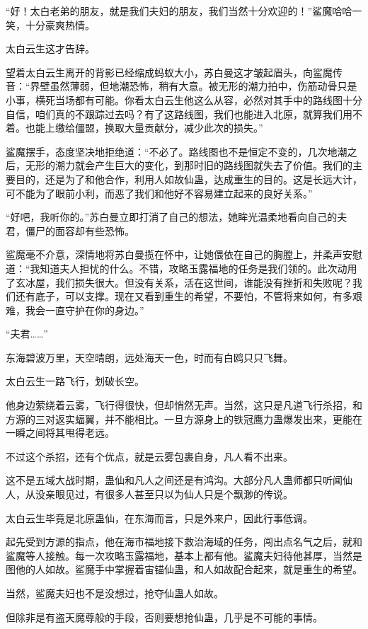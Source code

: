 \begin{this_body}
“好！太白老弟的朋友，就是我们夫妇的朋友，我们当然十分欢迎的！”鲨魔哈哈一笑，十分豪爽热情。

太白云生这才告辞。

望着太白云生离开的背影已经缩成蚂蚁大小，苏白曼这才皱起眉头，向鲨魔传音：“界壁虽然薄弱，但地潮恐怖，稍有大意。被无形的潮力拍中，伤筋动骨只是小事，横死当场都有可能。你看太白云生他这么从容，必然对其手中的路线图十分自信，咱们真的不跟踪过去吗？有了这路线图，我们也能进入北原，就算我们用不着。也能上缴给僵盟，换取大量贡献分，减少此次的损失。”

鲨魔摆手，态度坚决地拒绝道：“不必了。路线图也不是恒定不变的，几次地潮之后，无形的潮力就会产生巨大的变化，到那时旧的路线图就失去了价值。我们的主要目的，还是为了和他合作，利用人如故仙蛊，达成重生的目的。这是长远大计，可不能为了眼前小利，而恶了我们和他好不容易建立起来的良好关系。”

“好吧，我听你的。”苏白曼立即打消了自己的想法，她眸光温柔地看向自己的夫君，僵尸的面容却有些恐怖。

鲨魔毫不介意，深情地将苏白曼揽在怀中，让她偎依在自己的胸膛上，并柔声安慰道：“我知道夫人担忧的什么。不错，攻略玉露福地的任务是我们领的。此次动用了玄冰屋，我们损失很大。但没有关系，活在这世间，谁能没有挫折和失败呢？我们还有底子，可以支撑。现在又看到重生的希望，不要怕，不管将来如何，有多艰难，我会一直守护在你的身边。”

“夫君……”

东海碧波万里，天空晴朗，远处海天一色，时而有白鸥只只飞舞。

太白云生一路飞行，划破长空。

他身边萦绕着云雾，飞行得很快，但却悄然无声。当然，这只是凡道飞行杀招，和方源的三对返实蝠翼，并不能相比。一旦方源身上的铁冠鹰力蛊爆发出来，更能在一瞬之间将其甩得老远。

不过这个杀招，还有个优点，就是云雾包裹自身，凡人看不出来。

这不是五域大战时期，蛊仙和凡人之间还是有鸿沟。大部分凡人蛊师都只听闻仙人，从没亲眼见过，有很多人甚至只以为仙人只是个飘渺的传说。

太白云生毕竟是北原蛊仙，在东海而言，只是外来户，因此行事低调。

起先受到方源的指点，他在海市福地接下救治海域的任务，闯出点名气之后，就和鲨魔等人接触。每一次攻略玉露福地，基本上都有他。鲨魔夫妇待他甚厚，当然是图他的人如故。鲨魔手中掌握着宙锚仙蛊，和人如故配合起来，就是重生的希望。

当然，鲨魔夫妇也不是没想过，抢夺仙蛊人如故。

但除非是有盗天魔尊般的手段，否则要想抢仙蛊，几乎是不可能的事情。


\end{this_body}
